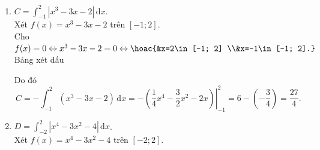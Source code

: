 \begin{bt}
{\begin{enumerate}
			Xét $f(x)=x^3+x^2-2x$ trên $[-2; 1]$.\\ Cho $f(x)=0\Leftrightarrow  x^3+x^2-2x=0\Leftrightarrow\hoac{&x=-2\in[-2; 1] \\&x=0\in[-2; 1] \\&x=1\in[-2; 1].}$\\
			Bảng xét dấu 
			\begin{center}
			\end{center}
			Do đó 
			\begin{eqnarray*}
				 B&=&\int_{-2}^1\left|x^3+x^2-2x\right|\mathrm{\,d}x\\
				 &=&\int_{-2}^0\left(x^3+x^2-2x\right) \mathrm{\,d}x-\int_0^1\left(x^3+x^2-2x\right) \mathrm{\,d}x\\
				&=&\left.\left(\dfrac{1}{4} x^4+\dfrac{1}{3} x^3-x^2\right)\right|_{-2}^0-\left.\left(\dfrac{1}{4} x^4+\dfrac{1}{3}  x^3-x^2\right)\right|_0 ^1\\
				 &=&-\left(-\dfrac{8}{3}\right)-\left(-\dfrac{5}{12}\right)\\
				 &=&\dfrac{37}{12}.
			\end{eqnarray*}
			\item  $C=\displaystyle\int_{-1}^2\left|x^3-3x-2\right|\mathrm{\,d}x$.\\
			Xét $f(x)=x^3-3x-2$  trên $[-1; 2]$.\\ Cho $f(x)=0\Leftrightarrow x^3-3x-2=0\Leftrightarrow\hoac{&x=2\in[-1; 2] \\&x=-1\in[-1; 2].}$\\
			 Bảng xét dấu
			\begin{center}
			\end{center}
			Do  đó \[C=-\displaystyle\int_{-1}^2\left(x^3-3x-2\right) \mathrm{\,d}x=-\left.\left(\dfrac{1}{4} x^4-\dfrac{3}{2} x^2-2x\right)\right|_{-1}^2=6-\left(-\dfrac{3}{4}\right)=\dfrac{27}{4}.\]
			 \item $D=\displaystyle\int_{-2}^2\left|x^4-3x^2-4\right|\mathrm{\,d}x$.\\
			Xét $f(x)=x^4-3x^2-4$ trên $[-2; 2]$.\\ 

\end{enumerate}}
\end{bt}
